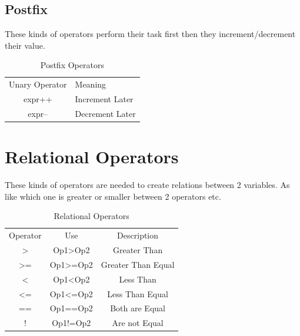 \documentclass[A4 paper,openany]{book}  %
\begin{document}
\subsection{Postfix}
These kinds of operators\cite{Ref8} perform their task first then they increment/decrement their value.
% 
%
\begin{table}[htbp]
    \begin{tabular}{cl}
        Unary Operator & Meaning          \\
        expr++         & Increment  Later \\
        expr--         & Decrement Later
    \end{tabular}
    \centering
    \caption{Postfix Operators}
\end{table}
% 
% 
\section{Relational Operators}
These kinds of operators\cite{Ref8} are needed to create relations between 2 variables. As like which one is greater or smaller between 2 operators etc.
% 
%
\begin{table}[htbp]
    \begin{tabular}{ccc}
        Operator        & Use                   & Description        \\
        \textgreater{}  & Op1\textgreater{}Op2  & Greater Than       \\
        \textgreater{}= & Op1\textgreater{}=Op2 & Greater Than Equal \\
        \textless{}     & Op1\textless{}Op2     & Less Than          \\
        \textless{}=    & Op1\textless{}=Op2    & Less Than Equal    \\
        ==              & Op1==Op2              & Both are Equal     \\
        !               & Op1!=Op2              & Are not Equal
    \end{tabular}
    \centering
    \caption{Relational Operators}
\end{table}

\newpage

% 
% 
\end{document}
